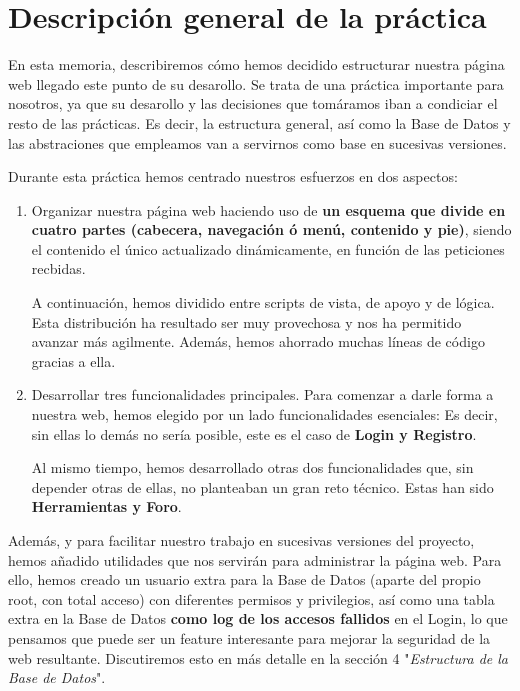 \documentclass[12pt]{report}
\begin{document}
\section{Descripción general de la práctica}

En esta memoria, describiremos cómo hemos decidido estructurar nuestra página web llegado este punto de su desarollo.  Se trata de una práctica importante para nosotros, ya que su desarollo y las decisiones que tomáramos iban a condiciar el resto de las prácticas. Es decir, la estructura general, así como la Base de Datos y las abstraciones que empleamos van a servirnos como base en sucesivas versiones.

Durante esta práctica hemos centrado nuestros esfuerzos en dos aspectos:

\begin{enumerate}  
\item Organizar nuestra página web haciendo uso de \textbf{un esquema que divide en cuatro partes (cabecera, navegación ó menú, contenido y pie)}, siendo el contenido el único actualizado dinámicamente, en función de las peticiones recbidas. 

A continuación, hemos dividido entre scripts de vista, de apoyo y de lógica. Esta distribución ha resultado ser muy provechosa y nos ha permitido avanzar más agilmente. Además, hemos ahorrado muchas líneas de código gracias a ella.

\item Desarrollar tres funcionalidades principales. Para comenzar a darle forma a nuestra web, hemos elegido por un lado funcionalidades esenciales: Es decir, sin ellas lo demás no sería posible, este es el caso de \textbf{Login y Registro}. 

Al mismo tiempo, hemos desarrollado otras dos funcionalidades que, sin depender otras de ellas, no planteaban un gran reto técnico. Estas han sido \textbf{Herramientas y Foro}.

\end{enumerate}

Además, y para facilitar nuestro trabajo en sucesivas versiones del proyecto, hemos añadido utilidades que nos servirán para administrar la página web. Para ello, hemos creado un usuario extra para la Base de Datos (aparte del propio root, con total acceso) con diferentes permisos y privilegios, así como una tabla extra en la Base de Datos \textbf{como log de los accesos fallidos} en el Login, lo que pensamos que puede ser un feature interesante para mejorar la seguridad de la web resultante. Discutiremos esto en más detalle en la sección 4 "\textit{Estructura de la Base de Datos}".
\end{document}
